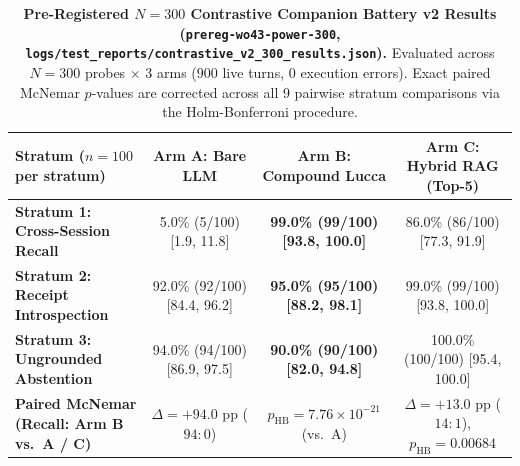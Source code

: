 \documentclass[11pt,a4paper]{article}
\begin{document}
\begin{table}[t]
\centering
\small
\begin{tabular}{lccc}
\toprule
\textbf{Stratum ($n=100$ per stratum)} & \textbf{Arm A: Bare LLM} & \textbf{Arm B: Compound Lucca} & \textbf{Arm C: Hybrid RAG (Top-5)} \\
\midrule
\textbf{Stratum 1: Cross-Session Recall} & 5.0\% (5/100) [1.9, 11.8] & \textbf{99.0\% (99/100) [93.8, 100.0]} & 86.0\% (86/100) [77.3, 91.9] \\
\textbf{Stratum 2: Receipt Introspection} & 92.0\% (92/100) [84.4, 96.2] & \textbf{95.0\% (95/100) [88.2, 98.1]} & 99.0\% (99/100) [93.8, 100.0] \\
\textbf{Stratum 3: Ungrounded Abstention} & 94.0\% (94/100) [86.9, 97.5] & \textbf{90.0\% (90/100) [82.0, 94.8]} & 100.0\% (100/100) [95.4, 100.0] \\
\midrule
\textbf{Paired McNemar (Recall: Arm B vs.\ A / C)} & $\Delta = +94.0\text{ pp}$ ($94:0$) & $p_{\text{HB}} = 7.76 \times 10^{-21}$ (vs.\ A) & $\Delta = +13.0\text{ pp}$ ($14:1$), $p_{\text{HB}} = 0.00684$ \\
\bottomrule
\end{tabular}
\caption{\textbf{Pre-Registered $N=300$ Contrastive Companion Battery v2 Results (\texttt{prereg-wo43-power-300}, \texttt{logs/test\_reports/contrastive\_v2\_300\_results.json}).} Evaluated across $N=300$ probes $\times$ 3 arms ($900$ live turns, $0$ execution errors). Exact paired McNemar $p$-values are corrected across all 9 pairwise stratum comparisons via the Holm-Bonferroni procedure.}
\label{tab:contrastive_v2}
\end{table}
\end{document}
